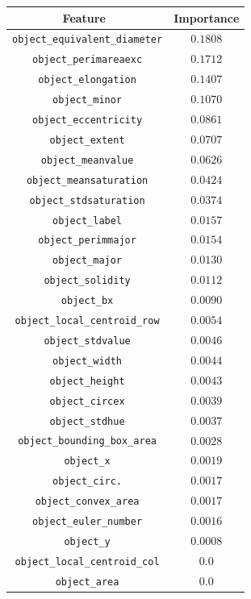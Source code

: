 \begin{table}[h!]
    \centering
    \begin{tabular}{cc}
        \hline
        Feature \, & Importance \\
        \hline 
        \verb|object_equivalent_diameter| & $0.1808$ \\
        \verb|object_perimareaexc| & $0.1712$ \\
        \verb|object_elongation| & $0.1407$ \\
        \verb|object_minor| & $0.1070$ \\
        \verb|object_eccentricity| & $0.0861$ \\
        \verb|object_extent| & $0.0707$ \\
        \verb|object_meanvalue| & $0.0626$ \\
        \verb|object_meansaturation| & $0.0424$ \\
        \verb|object_stdsaturation| & $0.0374$ \\
        \verb|object_label| & $0.0157$ \\
        \verb|object_perimmajor| & $0.0154$ \\
        \verb|object_major| & $0.0130$ \\
        \verb|object_solidity| & $0.0112$ \\
        \verb|object_bx| & $0.0090$ \\
        \verb|object_local_centroid_row| & $0.0054$ \\
        \verb|object_stdvalue| & $0.0046$ \\
        \verb|object_width| & $0.0044$ \\
        \verb|object_height| & $0.0043$ \\
        \verb|object_circex| & $0.0039$ \\
        \verb|object_stdhue| & $0.0037$ \\
        \verb|object_bounding_box_area| & $0.0028$ \\
        \verb|object_x| & $0.0019$ \\
        \verb|object_circ.| & $0.0017$ \\
        \verb|object_convex_area| & $0.0017$ \\
        \verb|object_euler_number| & $0.0016$ \\
        \verb|object_y| & $0.0008$ \\
        \verb|object_local_centroid_col| & $0.0$ \\
        \verb|object_area| & $0.0$ \\

\end{tabular}
\end{table}
